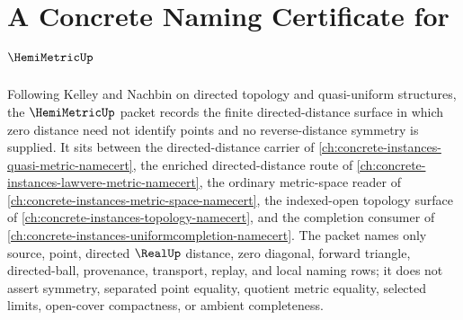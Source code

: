 \chapter{A Concrete Naming Certificate for $\HemiMetricUp$}
\label{ch:concrete-instances-hemimetric-namecert}

Following Kelley and Nachbin on directed topology and quasi-uniform structures, the $\HemiMetricUp$ packet records the finite directed-distance surface in which zero distance need not identify points and no reverse-distance symmetry is supplied. It sits between the directed-distance carrier of \autoref{ch:concrete-instances-quasi-metric-namecert}, the enriched directed-distance route of \autoref{ch:concrete-instances-lawvere-metric-namecert}, the ordinary metric-space reader of \autoref{ch:concrete-instances-metric-space-namecert}, the indexed-open topology surface of \autoref{ch:concrete-instances-topology-namecert}, and the completion consumer of \autoref{ch:concrete-instances-uniformcompletion-namecert}. The packet names only source, point, directed $\RealUp$ distance, zero diagonal, forward triangle, directed-ball, provenance, transport, replay, and local naming rows; it does not assert symmetry, separated point equality, quotient metric equality, selected limits, open-cover compactness, or ambient completeness.

